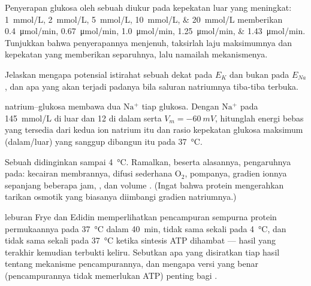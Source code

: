 \begin{exercise}[$\star\star$]\label{exo:b1:membranes-transport:7}
Penyerapan glukosa oleh sebuah  diukur pada kepekatan luar yang
meningkat: \qtylist{1;2;5;10;20}{mmol/L} memberikan
\qtylist{0.4;0.67;1.0;1.25;1.43}{\micro mol/min}. Tunjukkan bahwa
penyerapannya menjenuh, taksirlah laju maksimumnya dan kepekatan yang
memberikan separuhnya, lalu namailah mekanismenya.
\end{exercise}

\begin{exercise}[$\star\star$]\label{exo:b1:membranes-transport:8}
Jelaskan mengapa potensial istirahat sebuah  dekat pada $E_K$ dan
bukan pada $E_{Na}$, dan apa yang akan terjadi padanya bila saluran
natriumnya tiba-tiba terbuka.
\end{exercise}

\begin{exercise}[$\star\star$]\label{exo:b1:membranes-transport:9}
 natrium--glukosa membawa dua $\mathrm{Na^+}$ tiap glukosa.
Dengan $\mathrm{Na^+}$ pada \qty{145}{mmol/L} di luar dan \qty{12}{} di
dalam serta $V_m = \qty{-60}{mV}$, hitunglah energi bebas yang tersedia
dari kedua ion natrium itu dan rasio kepekatan glukosa maksimum
(dalam/luar) yang sanggup dibangun  itu pada \qty{37}{\celsius}.
\end{exercise}

\begin{exercise}[$\star\star\star$]\label{exo:b1:membranes-transport:10}
Sebuah  didinginkan sampai \qty{4}{\celsius}. Ramalkan, beserta
alasannya, pengaruhnya pada: kecairan membrannya, difusi sederhana
$\mathrm{O_2}$, pompanya, gradien ionnya sepanjang beberapa jam,
, dan volume . (Ingat bahwa protein 
mengerahkan tarikan osmotik yang biasanya diimbangi gradien natriumnya.)
\end{exercise}

\begin{exercise}[$\star\star\star$]\label{exo:b1:membranes-transport:11}
 leburan Frye dan Edidin memperlihatkan pencampuran sempurna protein
permukaannya pada \qty{37}{\celsius} dalam \qty{40}{min}, tidak sama
sekali pada \qty{4}{\celsius}, dan tidak sama sekali pada
\qty{37}{\celsius} ketika sintesis ATP dihambat --- hasil yang terakhir
kemudian terbukti keliru. Sebutkan apa yang disiratkan tiap hasil
tentang mekanisme pencampurannya, dan mengapa versi yang benar
(pencampurannya tidak memerlukan ATP) penting bagi .
\end{exercise}

